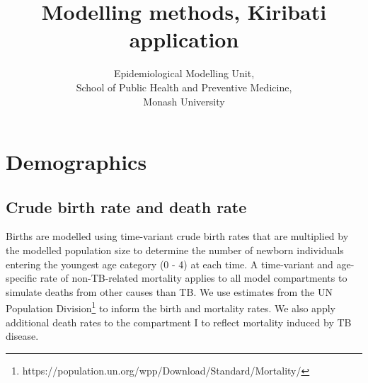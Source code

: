 \documentclass{article}
\author{
    Epidemiological Modelling Unit,
    \\ School of Public Health and Preventive Medicine,
    \\ Monash University
}
\title{Modelling methods, Kiribati application}
\begin{document}
\linespread{1.25}

\maketitle
\tableofcontents
\newpage


\section{Demographics}
\subsection{Crude birth rate and death rate}
Births are modelled using time-variant crude birth rates that are multiplied by the modelled population 
size to determine the number of newborn individuals entering the youngest age category (0 - 4) at each time. A time-variant 
and age-specific rate of non-TB-related mortality applies to all model compartments to simulate 
deaths from other causes than TB. We use estimates from the UN Population Division\footnote{https://population.un.org/wpp/Download/Standard/Mortality/} to inform the 
birth and mortality rates.
We also apply additional death rates to the compartment I to reflect mortality induced by TB 
disease.
\end{document}
